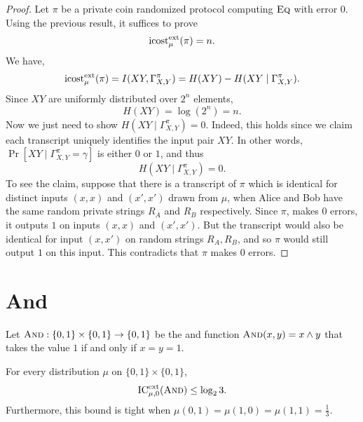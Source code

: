 \begin{proof}
Let $\pi$ be a private coin randomized protocol computing $\textsc{Eq}$ with error $0$. Using the previous result, it suffices to prove
$$\mathrm{icost}^{\mathrm{ext}}_\mu(\pi) = n.$$
We have,
$$\mathrm{icost}^{\mathrm{ext}}_\mu(\pi) = I(XY, \Gamma_{X,Y}^\pi) = H(XY) - H(XY \mid \Gamma_{X,Y}^\pi).$$
Since $XY$ are uniformly distributed over $2^n$ elements,
$$H(XY)= \log(2^n) = n.$$
Now we just need to show $H(XY \mid \Gamma_{X,Y}^\pi) = 0.$ Indeed, this holds since we claim each transcript uniquely identifies the input pair $XY$. In other words, $\Pr[XY\mid \Gamma_{X,Y}^\pi = \gamma]$ is either $0$ or $1$, and thus
$$H(XY\mid \Gamma_{X,Y}^\pi) = 0.$$
To see the claim, suppose that there is a transcript of $\pi$ which is identical for distinct inputs $(x,x)$ and $(x',x')$ drawn from $\mu$, when Alice and Bob have the same random private strings $R_A$ and $R_B$ respectively. Since $\pi$, makes $0$ errors, it outputs $1$ on inputs $(x,x)$ and $(x',x')$. But the transcript would also be identical for input $(x,x')$ on random strings $R_A, R_B$, and so $\pi$ would still output $1$ on this input. This contradicts that $\pi$ makes $0$ errors.
\end{proof}

\newpage 
\section{And}

Let $\textsc{And} : \{0,1\} \times \{0,1\} \to \{0,1\}$ be the and function $\textsc{And}(x,y) = x \wedge y$ that takes the value $1$ if and only if $x = y = 1$.

\begin{theorem}
For every distribution $\mu$ on $\{0,1\} \times \{0,1\}$,
\[
\mathrm{IC}^{\mathrm{ext}}_{\mu,0}(\textsc{And}) \le \log_2 3.
\]
Furthermore, this bound is tight when $\mu(0,1) = \mu(1,0) = \mu(1,1) = \frac13$.
\end{theorem}

